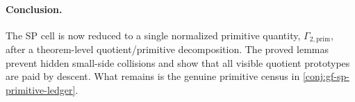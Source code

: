 \paragraph{Conclusion.}
The SP cell is now reduced to a single normalized primitive quantity,
\(\Gamma_{2,\mathrm{prim}}\), after a theorem-level quotient/primitive
decomposition.  The proved lemmas prevent hidden small-side collisions and
show that all visible quotient prototypes are paid by descent.  What remains is
the genuine primitive census in \cref{conj:gf-sp-primitive-ledger}.
